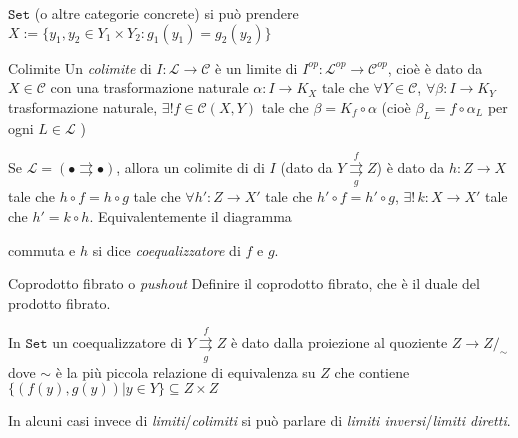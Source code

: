 \begin{example}{}
    \(\mathtt{Set}\) (o altre categorie concrete) si può prendere \(X := \{y_{1}, y_{2} \in Y_{1} \times  Y_{2} : g_{1}{(y_{1})} = g_{2}{(y_{2})}\}\) 
\end{example}

\begin{definition}{Colimite}
    Un \emph{colimite} di \(I : \mathcal{L} \to \mathcal{C}\) è un limite di \(I^{op} : \mathcal{L}^{op} \to \mathcal{C}^{op}\), cioè è dato da \(X \in \mathcal{C}\) 
    con una trasformazione naturale \(\alpha : I \to K_X\) tale che \(\forall Y \in \mathcal{C}\), \(\forall \beta: I \to K_Y\) trasformazione naturale, \(\exists ! f \in \mathcal{C}{(X, Y)}\) tale che \(\beta = K_f \circ \alpha\) (cioè \(\beta_L = f \circ \alpha_L\) per ogni \(L \in \mathcal{L}\) )
\end{definition}
\begin{example}{}
    Se \(\mathcal{L} = {(\bullet \rightrightarrows \bullet)}\), allora un
    colimite di di \(I\) (dato da \(Y \underset{g}{\overset{f}{\rightrightarrows}} Z\)) è dato da \(h : Z \to X\) tale che \(h \circ f = h \circ g\) tale che \(\forall h' : Z \to X'\) tale che \(h' \circ f = h' \circ g\), \(\exists  !\, k : X \to X'\) tale che \(h'= k \circ h\). Equivalentemente il diagramma
commuta e \(h\) si dice \emph{coequalizzatore} di \(f\) e \(g\).
\end{example}
\begin{eser}{Coprodotto fibrato o \emph{pushout}}
    Definire il coprodotto fibrato, che è il duale del prodotto fibrato.
\end{eser}

\begin{example}{}
    In \(\mathtt{Set}\) un coequalizzatore di \(Y \underset{g}{\overset{f}{\rightrightarrows}} Z\) è dato dalla
    proiezione al quoziente \(Z \to Z/_\sim \) dove \(\sim \) è la più piccola
    relazione di equivalenza su \(Z\) che contiene \(\{{(f{(y)}, g{(y)})} | y
    \in Y\} \subseteq Z \times  Z  \)
\end{example}
\begin{note}[zione]
    In alcuni casi invece di \emph{limiti}/\emph{colimiti} si può parlare di \emph{limiti inversi}/\emph{limiti diretti}.
\end{note}




